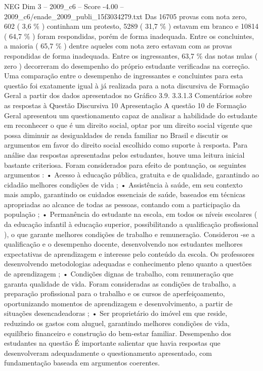 \begin{textsample}{NEG Dim 3 – 2009\_c6 – Score -4.00 – 2009\_c6/enade\_2009\_publi\_15f3034279.txt}
Das 16705 provas com nota zero, 602 ( 3,6 \% ) continham um protesto, 5289 ( 31,7 \% ) estavam em branco e 10814 ( 64,7 \% ) foram respondidas, porém de forma inadequada.
Entre os concluintes, a maioria ( 65,7 \% ) dentre aqueles com nota zero estavam com as provas respondidas de forma inadequada.
Entre os ingressantes, 63,7 \% das notas nulas ( zero ) decorreram do desempenho do próprio estudante verificadas na correção.
Uma comparação entre o desempenho de ingressantes e concluintes para esta questão foi exatamente igual à já realizada para a nota discursiva de Formação Geral a partir dos dados apresentados no Gráfico 3.9. 3.3.1.3 Comentários sobre as respostas à Questão Discursiva 10 Apresentação A questão 10 de Formação Geral apresentou um questionamento capaz de analisar a habilidade do estudante em reconhecer o que é um direito social, optar por um direito social vigente que possa diminuir as desigualdades de renda familiar no Brasil e discutir os argumentos em favor do direito social escolhido como suporte à resposta.
Para análise das respostas apresentadas pelos estudantes, houve uma leitura inicial bastante criteriosa.
Foram considerados para efeito de pontuação, os seguintes argumentos : • Acesso à educação pública, gratuita e de qualidade, garantindo ao cidadão melhores condições de vida ; • Assistência à saúde, em seu contexto mais amplo, garantindo os cuidados essenciais de saúde, baseados em técnicas apropriadas ao alcance de todas as pessoas, contando com a participação da população ; • Permanência do estudante na escola, em todos os níveis escolares ( da educação infantil à educação superior, possibilitando a qualificação profissional ), o que garante melhores condições de trabalho e remuneração.
Considerou -se a qualificação e o desempenho docente, desenvolvendo nos estudantes melhores expectativas de aprendizagem e interesse pelo conteúdo da escola.
Os professores desenvolvendo metodologias adequadas e conhecimento pleno quanto a questões de aprendizagem ; • Condições dignas de trabalho, com remuneração que garanta qualidade de vida.
Foram consideradas as condições de trabalho, a preparação profissional para o trabalho e os cursos de aperfeiçoamento, oportunizando momentos de aprendizagem e desenvolvimento, a partir de situações desencadeadoras ; • Ser proprietário do imóvel em que reside, reduzindo os gastos com aluguel, garantindo melhores condições de vida, equilíbrio financeiro e construção do bem-estar familiar.
Desempenho dos estudantes na questão É importante salientar que havia respostas que desenvolveram adequadamente o questionamento apresentado, com fundamentação baseada em argumentos coerentes.

\end{textsample}
